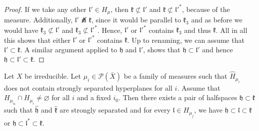 \begin{proof}
  If we take any other \(\mathfrak{l}' \in H_\mu\), then \(\mathfrak{k} \not\subset \mathfrak{l}'\) and \(\mathfrak{k} \not \subset \mathfrak{l}'^\ast\), because of the measure. Additionally, \(\mathfrak{l}' \not\pitchfork \mathfrak{k}\), since it would be parallel to \(\mathfrak{k}_3\) and as before we would have \(\mathfrak{k}_3 \not\subset \mathfrak{l}'\) and \(\mathfrak{k}_3 \not\subset \mathfrak{l}'^\ast\). Hence, \(\mathfrak{l}'\) or \(\mathfrak{l}'^\ast\) contains \(\mathfrak{k}_3\) and thus \(\mathfrak{k}\). All in all this shows that either \(\mathfrak{l}'\) or \(\mathfrak{l}'^\ast\) contains \(\mathfrak{k}\). Up to renaming, we can assume that \(\mathfrak{l}' \subset \mathfrak{k}\). A similar argument applied to \(\mathfrak{h}\) and \(\mathfrak{l}'\), shows that \(\mathfrak{h} \subset \mathfrak{l}'\) and hence \(\mathfrak{h} \subset \mathfrak{l}' \subset \mathfrak{k}\).
\end{proof}


\begin{lemma}[{\cite[Lemma~4.20]{MR3509968}}]
  \label{lem:4.20}
  Let \(X\) be irreducible. Let \(\mu_i \in \mathcal{P}(\bar X)\) be a family of measures such that \(\hat H_{\mu_i}\) does not contain strongly separated hyperplanes for all \(i\). Assume that \(H_{\mu_{i_0}} \cap H_{\mu_i} \neq \varnothing\) for all \(i\) and a fixed \(i_0\). Then there exists a pair of halfspaces \(\mathfrak{h} \subset \mathfrak{k}\) such that \(\mathfrak{\hat h}\) and \(\mathfrak{\hat k}\) are strongly separated and for every \(\mathfrak{l} \in H_{\mu_j}\), we have \(\mathfrak{h} \subset \mathfrak{l} \subset \mathfrak{k}\) or \(\mathfrak{h} \subset \mathfrak{l}^\ast \subset \mathfrak{k}\).
\end{lemma}

